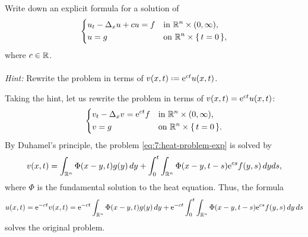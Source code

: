 \begin{problem}
  Write down an explicit formula for a solution of
  \[
    \left\{
      \begin{aligned}
        &u_t-\Delta_x u+cu=f&&\text{in \(\mathbb{R}^n\times(0,\infty)\),}\\
        &u=g&&\text{on \(\mathbb{R}^n\times\{\,t=0\,\}\),}
      \end{aligned}
    \right.
  \]
  where \(c\in\mathbb{R}\).
  \\\\
  \emph{Hint:} Rewrite the problem in terms of
  \(v(x,t)\defeq\rme^{ct}u(x,t)\).
\end{problem}
\begin{solution*}
  Taking the hint, let us rewrite the problem in terms of
  \(v(x,t)=\mathrm{e}^{ct}u(x,t)\):
  \begin{equation}
    \label{eq:7:heat-problem-exp}
    \left\{
      \begin{aligned}
        &v_t-\Delta_xv=\mathrm{e}^{ct}f&&\text{in
          \(\mathbb{R}^n\times(0,\infty),\)}\\
        &v=g&&\text{on \(\mathbb{R}^n\times\{\,t=0\,\}\).}
      \end{aligned}
    \right.
  \end{equation}
  By Duhamel's principle, the problem \eqref{eq:7:heat-problem-exp} is
  solved by
  \[
    v(x,t)=\int_{\mathbb{R}^n}\Phi(x-y,t)g(y)\mathop{}\!d y
    +\int_0^t\int_{\mathbb{R}^n}\Phi(x-y,t-s)\mathrm{e}^{cs}f(y,s)\mathop{}\!d yds,
  \]
  where \(\Phi\) is the fundamental solution to the heat equation. Thus,
  the formula
  \[
    u(x,t)=\mathrm{e}^{-ct}v(x,t)=\mathrm{e}^{-ct}\int_{\mathbb{R}^n}\Phi(x-y,t)g(y)\mathop{}\!d y
    +\mathrm{e}^{-ct}\int_0^t\int_{\mathbb{R}^n}\Phi(x-y,t-s)\mathrm{e}^{cs}f(y,s)\mathop{}\!d y\mathop{}\!d s
  \]
  solves the original problem.
\end{solution*}

